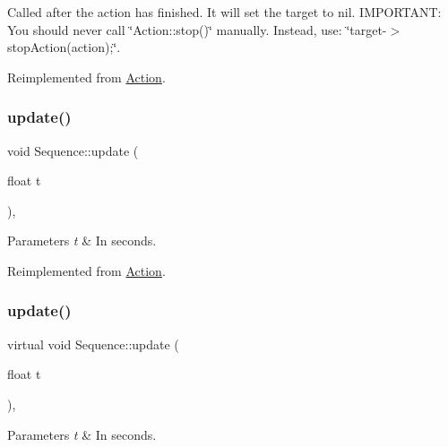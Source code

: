 Called after the action has finished. It will set the \textquotesingle{}target\textquotesingle{} to nil. I\+M\+P\+O\+R\+T\+A\+NT\+: You should never call \char`\"{}\+Action\+::stop()\char`\"{} manually. Instead, use\+: \char`\"{}target-\/$>$stop\+Action(action);\char`\"{}. 

Reimplemented from \hyperlink{classAction_a968267fa7a1dcc46a2976249a712d3c8}{Action}.

\mbox{\label{classSequence_a336d205df83e1a4ff0ab4ecbc8cf56e3}} 
\subsubsection{\texorpdfstring{update()}{update()}\hspace{0.1cm}{\footnotesize\ttfamily [1/2]}}
{\footnotesize\ttfamily void Sequence\+::update (\begin{DoxyParamCaption}\item[{float}]{t }\end{DoxyParamCaption})\hspace{0.3cm}{\ttfamily [override]}, {\ttfamily [virtual]}}


\begin{DoxyParams}{Parameters}
{\em t} & In seconds. \\
\hline
\end{DoxyParams}


Reimplemented from \hyperlink{classAction_a937e646e63915e33ad05ba149bfcf239}{Action}.

\mbox{\label{classSequence_a3db260a7840e606c3b3883de4f7b1f48}} 
\subsubsection{\texorpdfstring{update()}{update()}\hspace{0.1cm}{\footnotesize\ttfamily [2/2]}}
{\footnotesize\ttfamily virtual void Sequence\+::update (\begin{DoxyParamCaption}\item[{float}]{t }\end{DoxyParamCaption})\hspace{0.3cm}{\ttfamily [override]}, {\ttfamily [virtual]}}


\begin{DoxyParams}{Parameters}
{\em t} & In seconds. \\
\hline
\end{DoxyParams}


